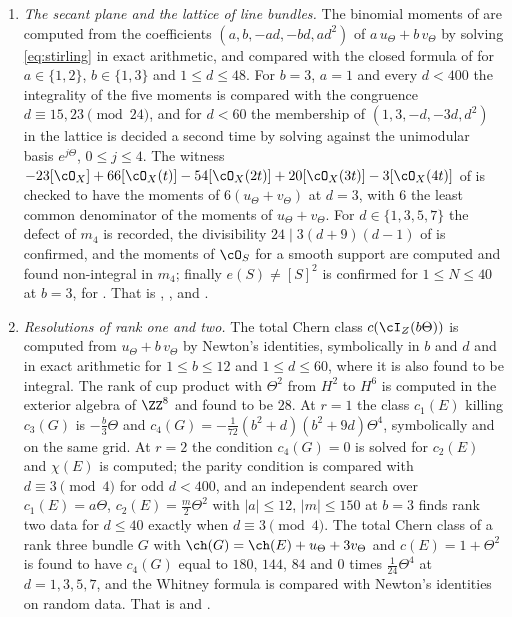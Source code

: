 \begin{enumerate}[label=\textup{(\Roman*)},leftmargin=*]
\item \emph{The secant plane and the lattice of line bundles.} The binomial
  moments of  are computed from the coefficients
  $(a,b,-ad,-bd,ad^{2})$ of $a\,u_{\Theta}+b\,v_{\Theta}$ by solving
  \eqref{eq:stirling} in exact arithmetic, and compared with the closed
  formula of  for $a\in\{1,2\}$, $b\in\{1,3\}$ and
  $1\le d\le48$. For $b=3$, $a=1$ and every $d<400$ the integrality of the
  five moments is compared with the congruence $d\equiv15,23\pmod{24}$, and
  for $d<60$ the membership of $(1,3,-d,-3d,d^{2})$ in the lattice is
  decided a second time by solving against the unimodular basis
  $e^{j\Theta}$, $0\le j\le4$. The witness
  $-23[\cO_{X}]+66[\cO_{X}(t)]-54[\cO_{X}(2t)]+20[\cO_{X}(3t)]-3[\cO_{X}(4t)]$
  of  is checked to have the moments of
  $6(u_{\Theta}+v_{\Theta})$ at $d=3$, with $6$ the least common denominator
  of the moments of $u_{\Theta}+v_{\Theta}$. For $d\in\{1,3,5,7\}$ the
  defect of $m_{4}$ is recorded, the divisibility $24\mid3(d+9)(d-1)$ of
   is confirmed, and the moments of $\cO_{S}$ for a
  smooth support are computed and found non-integral in $m_{4}$; finally
  $e(S)\ne[S]^{2}$ is confirmed for $1\le N\le40$ at $b=3$, for
  . That is ,
  ,  and
  .

\item \emph{Resolutions of rank one and two.} The total Chern class
  $c(\cI_{Z}(b\Theta))$ is computed from $u_{\Theta}+b\,v_{\Theta}$ by
  Newton's identities, symbolically in $b$ and $d$ and in exact arithmetic
  for $1\le b\le12$ and $1\le d\le60$, where it is also found to be
  integral. The rank of cup product with $\Theta^{2}$ from $H^{2}$ to
  $H^{6}$ is computed in the exterior algebra of $\ZZ^{8}$ and found to be
  $28$. At $r=1$ the class $c_{1}(E)$ killing $c_{3}(G)$ is $-\frac b3\Theta$
  and $c_{4}(G)=-\frac{1}{72}(b^{2}+d)(b^{2}+9d)\Theta^{4}$, symbolically and
  on the same grid. At $r=2$ the condition $c_{4}(G)=0$ is solved for
  $c_{2}(E)$ and $\chi(E)$ is computed; the parity condition is compared
  with $d\equiv3\pmod4$ for odd $d<400$, and an independent search over
  $c_{1}(E)=a\Theta$, $c_{2}(E)=\frac m2\Theta^{2}$ with $|a|\le12$,
  $|m|\le150$ at $b=3$ finds rank two data for $d\le40$ exactly when
  $d\equiv3\pmod4$. The total Chern class of a rank three bundle $G$ with
  $\ch(G)=\ch(E)+u_{\Theta}+3v_{\Theta}$ and $c(E)=1+\Theta^{2}$ is found to
  have $c_{4}(G)$ equal to $180$, $144$, $84$ and $0$ times
  $\frac1{24}\Theta^{4}$ at $d=1,3,5,7$, and the Whitney formula is compared
  with Newton's identities on random data. That is
   and .


\end{enumerate}
